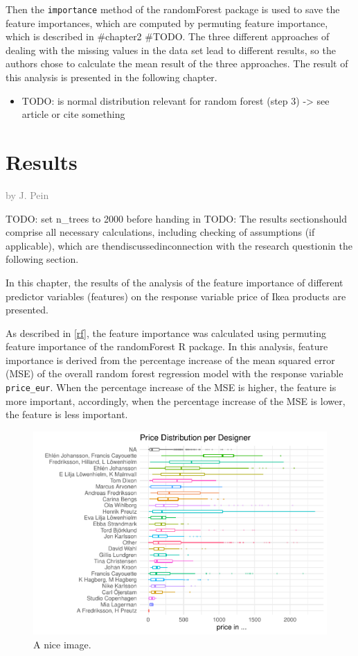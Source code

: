 \documentclass[a4paper, nobind]{templates/ociamthesis}
\providecommand{\tightlist}{%
  \setlength{\itemsep}{0pt}\setlength{\parskip}{0pt}}
\begin{document}
Then the \texttt{importance} method of the randomForest package is used to save the feature importances, which are computed by permuting feature importance, which is described in \#chapter2 \#TODO. The three different approaches of dealing with the missing values in the data set lead to different results, so the authors chose to calculate the mean result of the three approaches. The result of this analysis is presented in the following chapter.

\begin{itemize}
\tightlist
\item
  TODO: is normal distribution relevant for random forest (step 3) -\textgreater{} see article or cite something
\end{itemize}

\hypertarget{results}{%
\chapter{Results}\label{results}}

\hfill\textcolor{gray}{by J. Pein}

TODO: set n\_trees to 2000 before handing in
TODO: The results sectionshould comprise all necessary calculations, including checking of assumptions (if applicable), which are thendiscussedinconnection with the research questionin the following section.

In this chapter, the results of the analysis of the feature importance of different predictor variables (features) on the response variable price of Ikea products are presented.

As described in \ref{rf}, the feature importance was calculated using permuting feature importance of the randomForest R package. In this analysis, feature importance is derived from the percentage increase of the mean squared error (MSE) of the overall random forest regression model with the response variable \texttt{price\_eur}. When the percentage increase of the MSE is higher, the feature is more important, accordingly, when the percentage increase of the MSE is lower, the feature is less important.

\begin{figure}
\includegraphics[width=0.9\linewidth]{_main_files/figure-latex/unnamed-chunk-5-1} \caption{A nice image.}\label{fig:unnamed-chunk-5}
\end{figure}
\end{document}
